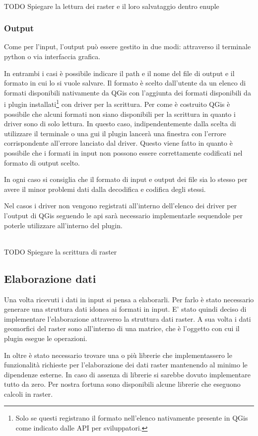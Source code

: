 \\TODO Spiegare la lettura dei raster e il loro salvataggio dentro enuple

\subsubsection{Output}
Come per l'input, l'output può essere gestito in due modi: attraverso il terminale python o via interfaccia grafica.

In entrambi i casi è possibile indicare il path e il nome del file di output e il formato in cui lo si vuole salvare.
Il formato è scelto dall'utente da un elenco di formati disponibili nativamente da QGis con l'aggiunta dei formati disponibili da i plugin installati\footnote{Solo se questi registrano il formato nell'elenco nativamente presente in QGis come indicato dalle API per sviluppatori.} con driver per la scrittura. Per come è costruito QGis è possibile che alcuni formati non siano disponibili per la scrittura in quanto i driver sono di solo lettura. In questo caso, indipendentemente dalla scelta di utilizzare il terminale o una gui il plugin lancerà una finestra con l'errore corrispondente all'errore lanciato dal driver. Questo viene fatto in quanto è possibile che i formati in input non possono essere correttamente codificati nel formato di output scelto.

In ogni caso si consiglia che il formato di input e output dei file sia lo stesso per avere il minor problemi dati dalla decodifica e codifica degli stessi. 

Nel casos i driver non vengono registrati all'interno dell'elenco dei driver per l'output di QGis seguendo le api sarà necessario implementarle sequendole per poterle utilizzare all'interno del plugin.

\\TODO Spiegare la scrittura di raster
\subsection{Elaborazione dati}
Una volta ricevuti i dati in input si pensa a elaborarli. Per farlo è stato necessario generare una struttura dati idonea ai formati in input. E' stato quindi deciso di implementare l'elaborazione attraverso la struttura dati raster. A sua volta i dati geomorfici del raster sono all'interno di una matrice, che è l'oggetto con cui il plugin esegue le operazioni.

In oltre è stato necessario trovare una o più librerie che implementassero le funzionalità richieste per l'elaborazione dei dati raster mantenendo al minimo le dipendenze esterne. In caso di assenza di librerie si sarebbe dovuto implementare tutto da zero. Per nostra fortuna sono disponibili alcune librerie che eseguono calcoli in raster.

